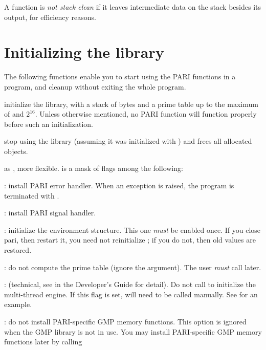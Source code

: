 A function is \emph{not stack clean} if it leaves intermediate data on the
stack besides its output, for efficiency reasons.

\section{Initializing the library}

The following functions enable you to start using the PARI functions
in a program, and cleanup without exiting the whole program.


 initialize the
library, with a stack of  bytes and a prime table
up to the maximum of  and $2^{16}$. Unless otherwise
mentioned, no PARI function will function properly before such an
initialization.

 stop using the library (assuming it was
initialized with ) and frees all allocated objects.

\label{se:pari_init_tech}

 as
, more flexible.  is a mask of flags
among the following:

  : install PARI error handler. When an exception is
raised, the program is terminated with .

  : install PARI signal handler.

  : initialize the  environment structure.
This one \emph{must} be enabled once. If you close pari, then restart it,
you need not reinitialize ; if you do not, then old values are
restored.

  : do not compute the prime table (ignore the
   argument). The user \emph{must} call
   later.

  : (technical, see  in the Developer's
Guide for detail). Do not call  to initialize the
multi-thread engine. If this flag is set,  will need to
be called manually. See  for an example.

  : do not install PARI-specific GMP memory functions.
This option is ignored when the GMP library is not in use. You may
install PARI-specific GMP memory functions later by calling

